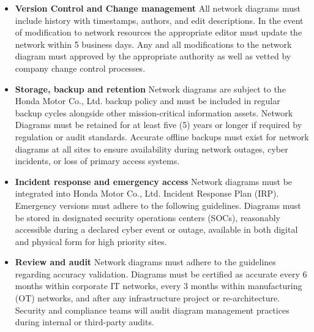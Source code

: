 \begin{itemize}
    \item \textbf{Version Control and Change management} 
    All network diagrams must include history with timestamps, authors, and edit descriptions. In the event of modification to network resources the appropriate editor must update the network within 5 business days. Any and all modifications to the network diagram must approved by the appropriate authority as well as vetted by company change control processes.
    \item \textbf{Storage, backup and retention}
    Network diagrams are subject to the Honda Motor Co., Ltd. backup policy and must be included in regular backup cycles alongside other mission-critical information assets. Network Diagrams must be retained for at least five (5) years or longer if required by regulation or audit standards. Accurate offline backups must exist for network diagrams at all sites to ensure availability during network outages, cyber incidents, or loss of primary access systems.
    \item \textbf{Incident response and emergency access}
    Network diagrams must be integrated into Honda Motor Co., Ltd. Incident Response Plan (IRP). Emergency versions must adhere to the following guidelines. Diagrams must be stored in designated security operations centers (SOCs), reasonably accessible during a declared cyber event or outage, available in both digital and physical form for high priority sites.
    \item \textbf{Review and audit}
    Network diagrams must adhere to the guidelines regarding accuracy validation. Diagrams must be certified as accurate every 6 months within corporate IT networks, every 3 months within manufacturing (OT) networks, and after any infrastructure project or re-architecture. Security and compliance teams will audit diagram management practices during internal or third-party audits.
\end{itemize}
